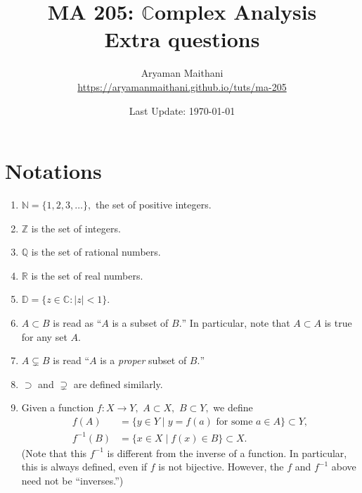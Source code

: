 \documentclass[12pt]{article}
\title{MA 205: $\mathbb{C}$omplex Analysis\\\large{Extra questions}}
\author{Aryaman Maithani\\\url{https://aryamanmaithani.github.io/tuts/ma-205}}
\date{Last Update: \today}
\theoremstyle{definition}
\numberwithin{thm}{section}
\newcommand{\md}[1]{{\left\lvert #1 \right\lvert}}
\begin{document}
\maketitle
\setcounter{section}{-1}
\tableofcontents
\newpage\section{Notations} \label{sec:notations}
\begin{enumerate}
	\item $\mathbb{N} = \{1, 2, 3, \ldots\},$ the set of positive integers.
	\item $\mathbb{Z}$ is the set of integers.
	\item $\mathbb{Q}$ is the set of rational numbers.
	\item $\mathbb{R}$ is the set of real numbers.
	\item $\mathbb{D} = \{z \in \mathbb{C} : \md{z} < 1\}$.
	\item $A \subset B$ is read as ``$A$ is a subset of $B.$'' In particular, note that $A \subset A$ is true for any set $A.$
	\item $A \subsetneq B$ is read ``$A$ is a \emph{proper} subset of $B.$''
	\item $\supset$ and $\supsetneq$ are defined similarly.
	\item Given a function $f:X \to Y,$ $A \subset X,$ $B \subset Y,$ we define
	\begin{align*} 
		f(A) &= \{y \in Y \mid y = f(a) \text{ for some } a \in A\} \subset Y,\\
		f^{-1}(B) &= \{x \in X \mid f(x) \in B\} \subset X.
	\end{align*}
	(Note that this $f^{-1}$ is different from the inverse of a function. In particular, this is always defined, even if $f$ is not bijective. However, the $f$ and $f^{-1}$ above need not be ``inverses.'')

\end{enumerate}
\end{document}
